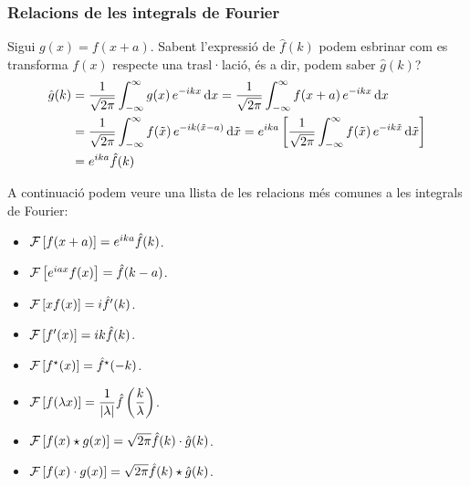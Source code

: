 \subsubsection*{Relacions de les integrals de Fourier}
\begin{example}
    Sigui $g(x) = f(x+a)$. Sabent l'expressió de $\hat{f}(k)$ podem esbrinar com es transforma $f(x)$ respecte una trasl·lació, és a dir, podem saber $\hat{g}(k)$?
    \begin{align*}
    \begin{aligned}
        \hat{g}(k) &= \frac{1}{\sqrt{2\pi}} \int_{-\infty}^{\infty} g(x)\,e^{-ikx} \mathop{}\!\mathrm{d} x = \frac{1}{\sqrt{2\pi}} \int_{-\infty}^{\infty} f(x+a)\,e^{-ikx} \mathop{}\!\mathrm{d} x \\
        &= \frac{1}{\sqrt{2\pi}} \int_{-\infty}^{\infty} f(\tilde{x})\,e^{-ik (\tilde{x} - a)} \mathop{}\!\mathrm{d} \tilde{x} = e^{ika} \left[ \frac{1}{\sqrt{2\pi}} \int_{-\infty}^{\infty} f(\tilde{x})\,e^{-ik\tilde{x}} \mathop{}\!\mathrm{d} \tilde{x} \right] \\
        &= e^{ika} \hat{f}(k)
    \end{aligned}
    \end{align*}
\end{example}
A continuació podem veure una llista de les relacions més comunes a les integrals de Fourier:
\begin{itemize}
    \item $\mathcal{F} \left[ f(x+a) \right] = e^{ika} \hat{f}(k)$.
    \item $\mathcal{F} \left[ e^{iax} f(x) \right] = \hat{f}(k-a)$.
    \item $\mathcal{F} \left[ x f(x) \right] = i \hat{f}'(k)$.
    \item $\mathcal{F} \left[ f'(x) \right] = i k \hat{f}(k)$.
    \item $\mathcal{F} \left[ f^{\star}(x) \right] = \hat{f}^{\star}(-k)$.
    \item $\mathcal{F} \left[ f(\lambda x) \right] = \dfrac{1}{\left| \lambda \right|} \hat{f}\left( \dfrac{k}{\lambda} \right)$.
    \item $\mathcal{F} \left[ f(x) \star g(x) \right] = \sqrt{2\pi} \hat{f}(k) \cdot \hat{g}(k)$.
    \item $\mathcal{F} \left[ f(x) \cdot g(x) \right] = \sqrt{2\pi} \hat{f}(k) \star \hat{g}(k)$.
\end{itemize}

